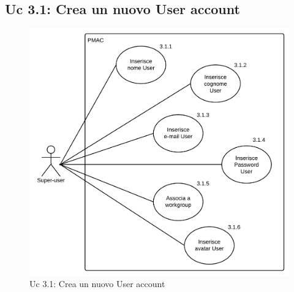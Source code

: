 \documentclass[10pt,a4paper]{article}
\begin{document}
\subsection{Uc 3.1: Crea un nuovo User account}
\begin{figure}[ht]
\centering
\caption{Uc 3.1: Crea un nuovo User account}
\includegraphics[scale=0.9]{UseCase/Uc3_1} %
\end{figure}
\end{document}

